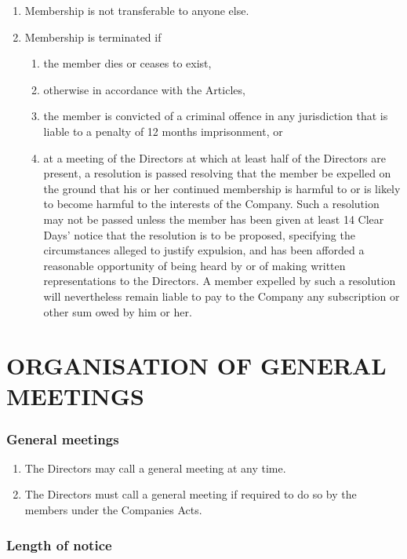 \documentclass[a4paper,12pt]{article}
\begin{document}
\begin{enumerate}
  \item Membership is not transferable to anyone else. %
  \item Membership is terminated if%
  \begin{enumerate}
    \item the member dies or ceases to exist, %
    \item otherwise in accordance with the Articles, %
    \item the member is convicted of a criminal offence in any jurisdiction that is liable to a penalty of 12 months imprisonment, or %
    \item at a meeting of the Directors at which at least half of the Directors are present, a resolution is passed resolving that the member be expelled on the ground that his or her continued membership is harmful to or is likely to become harmful to the interests of the Company. Such a resolution may not be passed unless the member has been given at least 14 Clear Days’ notice that the resolution is to be proposed, specifying the circumstances alleged to justify expulsion, and has been afforded a reasonable opportunity of being heard by or of making written representations to the Directors. A member expelled by such a resolution will nevertheless remain liable to pay to the Company any subscription or other sum owed by him or her.
  \end{enumerate}
\end{enumerate}

\part*{ORGANISATION OF GENERAL MEETINGS}

\section{General meetings}

\begin{enumerate}
  \item The Directors may call a general meeting at any time.
  \item The Directors must call a general meeting if required to do so by the members under the Companies Acts.
\end{enumerate}

\section{Length of notice}
\end{document}

